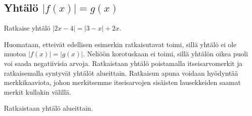 \subsection*{Yhtälö $|f(x)|=g(x)$}

\begin{esimerkki}
	Ratkaise yhtälö $|2x-4|=|3-x|+2x$.
	\begin{esimratk}
		Huomataan, etteivät edellisen esimerkin ratkaisutavat toimi, sillä yhtälö ei ole muotoa $|f(x)|=|g(x)|$. Neliöön korotuskaan ei toimi, sillä yhtälön oikea puoli voi saada negatiivisia arvoja. Ratkaistaan yhtälö poistamalla itseisarvomerkit ja ratkaisemalla syntyvät yhtälöt alueittain. Ratkaisun apuna voidaan hyödyntää merkkikaaviota, johon merkitsemme itseisarvojen sisäisten lausekkeiden saamat merkit kullakin välillä.

		\begin{lukusuora}{0}{4}{4}
		\end{lukusuora}
		\begin{lukusuora}{1}{5}{4}
		\end{lukusuora}
		
		\begin{center}
			\begin{merkkikaavio}{2}

				\merkkikaavioMerkki{$-$}
				\merkkikaavioMerkki{$+$}
				\merkkikaavioMerkki{$+$}

			\merkkikaavioUusirivi
				\merkkikaavioMerkki{$+$}
				\merkkikaavioMerkki{$+$}
				\merkkikaavioMerkki{$-$}
			\end{merkkikaavio}
		\end{center}
		
		Ratkaistaan yhtälö alueittain.
\end{esimratk}
\end{esimerkki}

